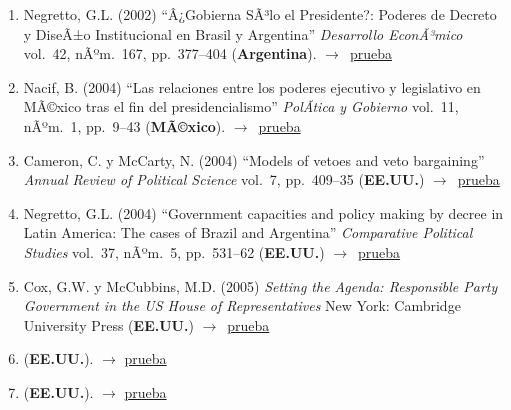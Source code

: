 \documentclass[12 pt, letter]{article}
\newenvironment{CitasMiTrabajo}{
    \begin{footnotesize}
    \begin{enumerate}[label={\footnotesize\emph{cita~\arabic*}},ref=\arabic*] %
        \setlength{\itemsep}{.1\itemsep}
        \setlength{\parskip}{.1\parskip}
    }{\end{enumerate}\end{footnotesize}}
\begin{document}
        \begin{CitasMiTrabajo}

        \item Negretto, G.L. (2002) ``Â¿Gobierna SÃ³lo el Presidente?: Poderes de Decreto y DiseÃ±o Institucional en Brasil y Argentina'' \emph{Desarrollo EconÃ³mico} vol.\ 42, nÃºm.\ 167, pp.\ 377--404  (\textbf{Argentina}). $\rightarrow$~\href{http://ericmagar.com/cv/cites/BullyPulpits/negretto.pdf}{prueba}

        \item Nacif, B. (2004) ``Las relaciones entre los poderes ejecutivo y
        legislativo en MÃ©xico tras el fin del presidencialismo''
        \emph{PolÃ­tica y Gobierno} vol.\ 11, nÃºm.\ 1, pp.\ 9--43  (\textbf{MÃ©xico}). $\rightarrow$~\href{http://ericmagar.com/cv/cites/BullyPulpits/Benito_Nacif_p-9-42.pdf}{prueba}

        \item Cameron, C. y McCarty, N. (2004) ``Models of vetoes and veto
        bargaining'' \emph{Annual Review of Political Science} vol.\ 7, pp.\ 409--35
        (\textbf{EE.UU.}) $\rightarrow$~\href{http://ericmagar.com/cv/cites/BullyPulpits/cammc.pdf}{prueba}

        \item Negretto, G.L. (2004) ``Government capacities and
        policy making by decree in Latin America: The cases of Brazil and
        Argentina'' \emph{Comparative Political Studies} vol.\ 37, nÃºm.\ 5, pp.\ 531--62
        (\textbf{EE.UU.}) $\rightarrow$~\href{http://ericmagar.com/cv/cites/BullyPulpits/neg2.pdf}{prueba}

        \item Cox, G.W. y McCubbins, M.D. (2005)
        \emph{Setting the Agenda: Responsible Party Government in the US House of Representatives} New
        York: Cambridge University Press (\textbf{EE.UU.}) $\rightarrow$~\href{http://ericmagar.com/cv/cites/BullyPulpits/coxmcS.pdf}{prueba}

        \item {} (\textbf{EE.UU.}). $\rightarrow$ \href{http://ericmagar.com/cv/cites/BullyPulpits/pachon2008phd.pdf}{prueba}

        \item {} (\textbf{EE.UU.}). $\rightarrow$ \href{http://ericmagar.com/cv/cites/BullyPulpits/mejia.pdf}{prueba}


\end{CitasMiTrabajo}
\end{document}
